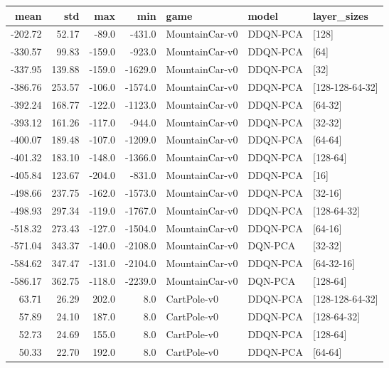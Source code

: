 \begin{tabular}{rrrrlll}
\toprule
   mean &     std &    max &     min &            game &     model &      layer\_sizes \\
\midrule
-202.72 &   52.17 &  -89.0 &  -431.0 &  MountainCar-v0 &  DDQN-PCA &            [128] \\
-330.57 &   99.83 & -159.0 &  -923.0 &  MountainCar-v0 &  DDQN-PCA &             [64] \\
-337.95 &  139.88 & -159.0 & -1629.0 &  MountainCar-v0 &  DDQN-PCA &             [32] \\
-386.76 &  253.57 & -106.0 & -1574.0 &  MountainCar-v0 &  DDQN-PCA &  [128-128-64-32] \\
-392.24 &  168.77 & -122.0 & -1123.0 &  MountainCar-v0 &  DDQN-PCA &          [64-32] \\
-393.12 &  161.26 & -117.0 &  -944.0 &  MountainCar-v0 &  DDQN-PCA &          [32-32] \\
-400.07 &  189.48 & -107.0 & -1209.0 &  MountainCar-v0 &  DDQN-PCA &          [64-64] \\
-401.32 &  183.10 & -148.0 & -1366.0 &  MountainCar-v0 &  DDQN-PCA &         [128-64] \\
-405.84 &  123.67 & -204.0 &  -831.0 &  MountainCar-v0 &  DDQN-PCA &             [16] \\
-498.66 &  237.75 & -162.0 & -1573.0 &  MountainCar-v0 &  DDQN-PCA &          [32-16] \\
-498.93 &  297.34 & -119.0 & -1767.0 &  MountainCar-v0 &  DDQN-PCA &      [128-64-32] \\
-518.32 &  273.43 & -127.0 & -1504.0 &  MountainCar-v0 &  DDQN-PCA &          [64-16] \\
-571.04 &  343.37 & -140.0 & -2108.0 &  MountainCar-v0 &   DQN-PCA &          [32-32] \\
-584.62 &  347.47 & -131.0 & -2104.0 &  MountainCar-v0 &  DDQN-PCA &       [64-32-16] \\
-586.17 &  362.75 & -118.0 & -2239.0 &  MountainCar-v0 &   DQN-PCA &         [128-64] \\
  63.71 &   26.29 &  202.0 &     8.0 &     CartPole-v0 &  DDQN-PCA &  [128-128-64-32] \\
  57.89 &   24.10 &  187.0 &     8.0 &     CartPole-v0 &  DDQN-PCA &      [128-64-32] \\
  52.73 &   24.69 &  155.0 &     8.0 &     CartPole-v0 &  DDQN-PCA &         [128-64] \\
  50.33 &   22.70 &  192.0 &     8.0 &     CartPole-v0 &  DDQN-PCA &          [64-64] \\

\end{tabular}

